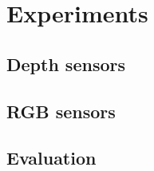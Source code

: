 \chapter{Experiments} \label{experiments}

\section{Depth sensors}

\section{RGB sensors}

\section{Evaluation}
